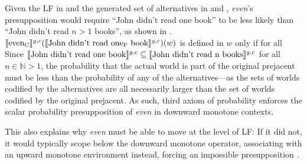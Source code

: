 \xe
Given the LF in  and the generated set of alternatives in  and , \textit{even}'s presupposition would require \enquote{John didn't read one book} to be less likely than \enquote{John didn't read $n>1$ books}, as shown in .
\ex{}
$\intension[g,c]{even\textsubscript{C}}(\intension[g,c]{John didn't read one\textsubscript{F} book})(w)$ is defined in $w$ only if for all\linebreak{}
\xe
Since $\intension[g,c]{John didn't read one book}\subseteq\intension[g,c]{John didn't read n books}$ for all $n\in\mathbb{N}>1$, the probability that the actual world is part of the original prejacent must be less than the probability of any of the alternatives---as the sets of worlds codified by the alternatives are all necessarily larger than the set of worlds codified by the original prejacent. As such,  third axiom of probability enforces the scalar probability presupposition of \textit{even} in downward monotone contexts.

This also explains why \textit{even} must be able to move at the level of LF: If it did not, it would typically scope below the downward monotone operator, associating with an upward monotone environment instead, forcing an impossible presupposition \parencite[see, amongst others,][]{Karttunen1979,Lee1994,Crnic2011}.

